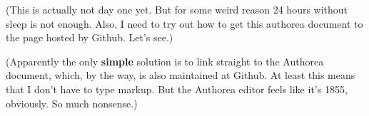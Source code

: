 
(This is actually not day one yet. But for some weird reason 24 hours without sleep is not enough. Also, I need to try out how to get this authorea document to the page hosted by Github. Let's see.)

(Apparently the only \textbf{simple} solution is to link straight to the Authorea document, which, by the way, is also maintained at Github. At least this means that I don't have to type markup. But the Authorea editor feels like it's 1855, obviously. So much nonsense.)